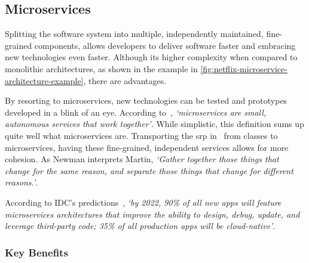 


\subsection{Microservices}\label{state-of-the-art:ss:microservices}


Splitting the software system into multiple, independently maintained, fine-grained components, allows developers to deliver software faster and embracing new technologies even faster. Although its higher complexity when compared to monolithic architectures, as shown in the example in \cref{fig:netflix-microservice-architecture-example}, there are advantages.



By resorting to microservices, new technologies can be tested and prototypes developed in a blink of an eye.
According to~\Parencite{newman_2015}, \textit{`microservices are small, autonomous services that work together'}. While simplistic, this definition sums up quite well what microservices are. Transporting the \gls{srp} in~\Parencite{martin_2014} from classes to microservices, having these fine-grained, independent services allows for more cohesion. As Newman interprets Martin, \textit{`Gather together those things that change for the
same reason, and separate those things that change for different reasons.'}.




According to IDC's predictions~\Parencite{idc_2019}, \textit{`by 2022, 90\% of all new apps will feature microservices architectures that improve the ability to design, debug, update, and leverage third-party code; 35\% of all production apps will be cloud-native'}.



\subsubsection{Key Benefits}\label{state-of-the-art:sss:key-benefits}

